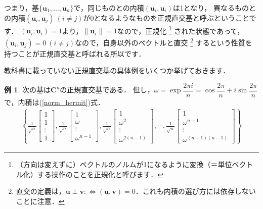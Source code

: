 \documentclass[dvipdfmx]{jsarticle}
\theoremstyle{definition}
\newtheorem{example}[definition]{例}
\begin{document}
つまり，基$\{ \bm{u}_1, \ldots, \bm{u}_n \}$で，同じものとの内積$(\bm{u}_i, \bm{u}_i)$は1となり，
異なるものとの内積$(\bm{u}_i, \bm{u}_j) \ (i \neq j)$が0となるようなものを正規直交基と呼ぶということです．
$(\bm{u}_i, \bm{u}_i) = 1$より，$\| \bm{u}_i \| = 1$なので，正規化
\footnote{（方向は変えずに）ベクトルのノルムが1になるように変換（＝単位ベクトル化）する操作のことを正規化と呼びます．}
された状態であって，$(\bm{u}_i, \bm{u}_j) = 0 \ (i \neq j)$なので，自身以外のベクトルと直交
\footnote{直交の定義は，$\bm{u} \perp \bm{v} :\Longleftrightarrow (\bm{u}, \bm{v}) = 0$．これも内積の選び方には依存しないことに注意．}
するという性質を持つことが正規直交基と呼ばれる所以です．

教科書に載っていない正規直交基の具体例をいくつか挙げておきます．

\begin{example}
    次の基は$\bm{C}^n$の正規直交基である．
    但し，$\omega = \exp{\dfrac{2\pi i}{n}} = \cos{\dfrac{2\pi}{n}} + i \sin{\dfrac{2\pi}{n}}$で，内積は(\ref{norm_hermit})式．
    \begin{align*}
        \left\{
            \frac{1}{\sqrt{n}} \begin{bmatrix} 1 \\ 1 \\ \vdots \\ 1 \end{bmatrix} ,
            \frac{1}{\sqrt{n}} \begin{bmatrix} 1 \\ \omega \\ \vdots \\ \omega^{n-1} \end{bmatrix} ,
            \frac{1}{\sqrt{n}} \begin{bmatrix} 1 \\ \omega^2 \\ \vdots \\ \omega^{2(n-1)} \end{bmatrix} ,
            \cdots ,
            \frac{1}{\sqrt{n}} \begin{bmatrix} 1 \\ \omega^{n-1} \\ \vdots \\ \omega^{(n-1)(n-1)} \end{bmatrix}
        \right\}
    \end{align*}
\end{example}

\vspace{\baselineskip}
\end{document}
